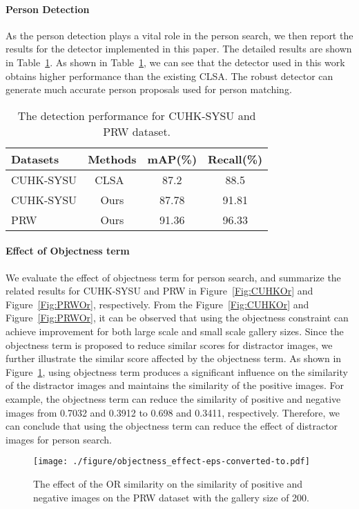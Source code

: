 \documentclass[journal]{IEEEtran}
\begin{document}
\paragraph{Person Detection}
As the person detection plays a vital role in the person search, we then report the results for the detector implemented in this paper. The detailed results are shown in Table~\ref{Tab:det}. As shown in Table~\ref{Tab:det}, we can see that the detector used in this work obtains higher performance than the existing CLSA. The robust detector can generate much accurate person proposals used for person matching.

\begin{table}
\caption{The detection performance for CUHK-SYSU and PRW dataset.}
\label{Tab:det}
\begin{tabular}{lccc}
\hline
Datasets & Methods & mAP(\%) & Recall(\%)\\
\hline
\hline
CUHK-SYSU & CLSA~\cite{LanZG18} & 87.2 & 88.5 \\
CUHK-SYSU & Ours & 87.78 & 91.81 \\
PRW &Ours& 91.36 & 96.33 \\
\hline
\end{tabular}
\end{table}

\paragraph{Effect of Objectness term} We evaluate the effect of objectness term for person search, and summarize the related results for CUHK-SYSU and PRW in Figure~\ref{Fig:CUHKOr} and Figure~\ref{Fig:PRWOr}, respectively. From the Figure~\ref{Fig:CUHKOr} and Figure~\ref{Fig:PRWOr}, it can be observed that using the objectness constraint can achieve improvement for both large scale and small scale gallery sizes. 
Since the objectness term is proposed to reduce similar scores for distractor images, we further illustrate the similar score affected by the objectness term. 
As shown in Figure~\ref{Fig:effect}, using objectness term produces a significant influence on the similarity of the distractor images and maintains the similarity of the positive images. 
For example,  the objectness term can reduce the similarity of positive and negative images from 0.7032 and 0.3912 to 0.698 and 0.3411, respectively. 
Therefore, we can conclude that using the objectness term can reduce the effect of distractor images for person search.

\begin{figure}
\begin{center}
\texttt{[image: ./figure/objectness\_effect-eps-converted-to.pdf]}
\end{center}
\caption{The effect of the OR similarity on the similarity of positive and negative images on the PRW dataset with the gallery size of 200.}
\label{Fig:effect}
\end{figure}
\end{document}
